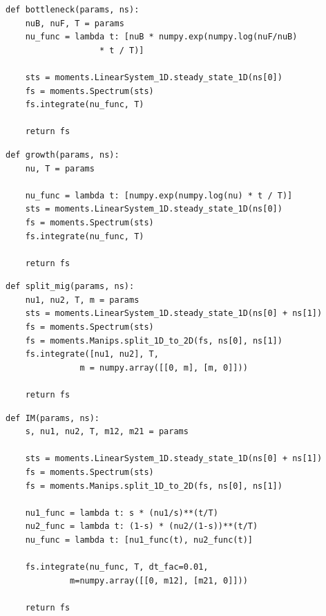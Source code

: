 \documentclass[12pt]{article}
\makeatletter
\newcommand{\py}[1]{\lstinline[breaklines=true,language=Python, showstringspaces=False]@#1@}
\makeatother
\begin{document}
\clearpage

\begin{lstlisting}[caption={\textbf{Bottleneck:} At time \py{TF} + \py{TB} in the past, an equilibrium population goes through a bottleneck of depth \py{nuB}, recovering to relative size \py{nuF}.}, float, label={lst:bottleneck}]
def bottleneck(params, ns):
    nuB, nuF, T = params
    nu_func = lambda t: [nuB * numpy.exp(numpy.log(nuF/nuB) 
    			   * t / T)]

    sts = moments.LinearSystem_1D.steady_state_1D(ns[0])
    fs = moments.Spectrum(sts)
    fs.integrate(nu_func, T)

    return fs
\end{lstlisting}

\begin{lstlisting}[caption={\textbf{Exponential growth:} At time \py{T} in the past, an equilibrium population begins growing exponentially, reaching size \py{nu} at present.}, float]
def growth(params, ns):
    nu, T = params

    nu_func = lambda t: [numpy.exp(numpy.log(nu) * t / T)]
    sts = moments.LinearSystem_1D.steady_state_1D(ns[0])
    fs = moments.Spectrum(sts)
    fs.integrate(nu_func, T)

    return fs
\end{lstlisting}

\begin{lstlisting}[caption={\textbf{Split with migration:} At time \py{T} in the past, two population diverge from an equilibrium population, with relative sizes \py{nu1} and \py{nu2} and with symmetric migration at rate \py{m}.}, float]
def split_mig(params, ns):
    nu1, nu2, T, m = params
    sts = moments.LinearSystem_1D.steady_state_1D(ns[0] + ns[1])
    fs = moments.Spectrum(sts)
    fs = moments.Manips.split_1D_to_2D(fs, ns[0], ns[1])
    fs.integrate([nu1, nu2], T, 
    		   m = numpy.array([[0, m], [m, 0]]))

    return fs
\end{lstlisting}

\begin{lstlisting}[caption={\textbf{Two-population isolation-with-migration:} The ancestral population splits into two, with a fraction \py{s} going into pop 1 and fraction \py{1-s} into pop 2. The populations then grow exponentially, with asymmetric migration allowed between them.}, float]
def IM(params, ns):
    s, nu1, nu2, T, m12, m21 = params

    sts = moments.LinearSystem_1D.steady_state_1D(ns[0] + ns[1])
    fs = moments.Spectrum(sts)
    fs = moments.Manips.split_1D_to_2D(fs, ns[0], ns[1])
    
    nu1_func = lambda t: s * (nu1/s)**(t/T)
    nu2_func = lambda t: (1-s) * (nu2/(1-s))**(t/T)
    nu_func = lambda t: [nu1_func(t), nu2_func(t)]

    fs.integrate(nu_func, T, dt_fac=0.01, 
    		 m=numpy.array([[0, m12], [m21, 0]]))

    return fs
\end{lstlisting}
\end{document}

